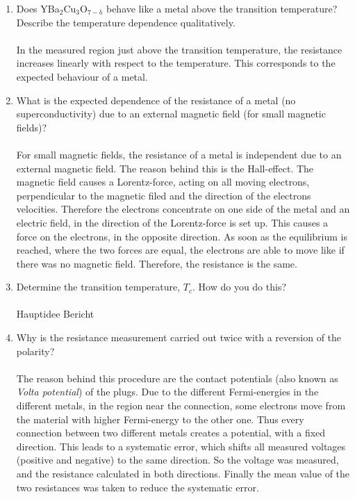 \documentclass[a4paper,parskip,11pt, DIV12]{scrreprt}
\begin{document}
\begin{enumerate}

\item Does YBa$_2$Cu$_3$O$_{7-\mathrm{\delta}}$  behave like a metal above the transition temperature? Describe the temperature dependence qualitatively.\\
\\
In the measured region just above the transition temperature, the resistance increases linearly with respect to the temperature. This corresponds to the expected behaviour of a metal.  

\item What is the expected dependence of the resistance of a metal (no superconductivity) due to an external magnetic field (for small magnetic fields)?\\
\\
For small magnetic fields, the resistance of a metal is independent due to an external magnetic field. The reason behind this is the Hall-effect. The magnetic field causes a Lorentz-force, acting on all moving electrons, perpendicular to the magnetic filed and the direction of the electrons velocities. Therefore the electrons concentrate on one side of the metal and an electric field, in the direction of the Lorentz-force is set up. This causes a force on the electrons, in the opposite direction. As soon as the equilibrium is reached, where the two forces are equal, the electrons are able to move like if there was no magnetic field. Therefore, the resistance is the same. 

\item Determine the transition temperature, $T_c$. How do you do this?\\
\\
Hauptidee Bericht

\item Why is the resistance measurement carried out twice with a reversion of the polarity?\\
\\
The reason behind this procedure are the contact potentials (also known as \emph{Volta potential}) of the plugs. Due to the different Fermi-energies in the different metals, in the region near the connection, some electrons move from the material with higher Fermi-energy to the other one. Thus every connection between two different metals creates a potential, with a fixed direction.  This leads to a systematic error, which shifts all measured voltages (positive and negative) to the same direction. So the voltage was measured, and the resistance calculated in both directions. Finally the mean value of the two resistances was taken to reduce the systematic error. 

\end{enumerate}
\end{document}
